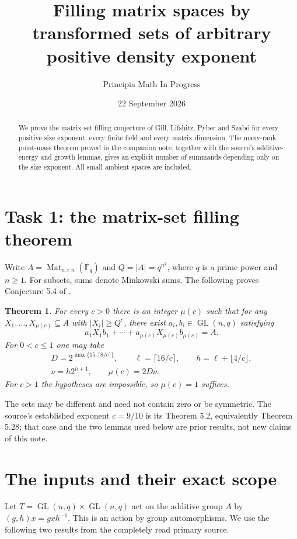 \documentclass[11pt]{article}
\title{Filling matrix spaces by transformed sets of arbitrary positive density exponent}
\author{Principia Math In Progress}
\date{22 September 2026}
\newtheorem{theorem}{Theorem}
\newcommand{\Mat}{\operatorname{Mat}}
\newcommand{\GL}{\operatorname{GL}}
\begin{document}
\maketitle
\begin{abstract}
We prove the matrix-set filling conjecture of Gill, Lifshitz, Pyber and
Szab\'o for every positive size exponent, every finite field and every
matrix dimension. The many-rank point-mass theorem proved in the companion
note, together with the source's additive-energy and growth lemmas,
gives an explicit number of summands depending only on the size exponent.
All small ambient spaces are included.
\end{abstract}

\section*{Task 1: the matrix-set filling theorem}
Write $A=\Mat_{n\times n}(\mathbb F_q)$ and $Q=|A|=q^{n^2}$, where
$q$ is a prime power and $n\ge1$. For subsets, sums denote Minkowski sums.
The following proves Conjecture 5.4 of \cite{source}.

\begin{theorem}\label{main}
For every $c>0$ there is an integer $\mu(c)$ such that for any
$X_1,\ldots,X_{\mu(c)}\subseteq A$ with $|X_i|\ge Q^c$, there exist
$a_i,b_i\in\GL(n,q)$ satisfying
\[
 a_1X_1b_1+\cdots+a_{\mu(c)}X_{\mu(c)}b_{\mu(c)}=A.
\]
For $0<c\le1$ one may take
\[
 \begin{gathered}
 D=2^{\max\{15,\lceil8/c\rceil\}},\qquad
 \ell=\lceil16/c\rceil,\qquad h=\ell+\lfloor4/c\rfloor,\\
 \nu=h2^{h+1},\qquad \mu(c)=2D\nu.
 \end{gathered}
\]
For $c>1$ the hypotheses are impossible, so $\mu(c)=1$ suffices.
\end{theorem}

The sets may be different and need not contain zero or be symmetric.
The source's established exponent $c=9/10$ is its Theorem 5.2,
equivalently Theorem 5.28; that case and the two lemmas used below are
prior results, not new claims of this note.

\section*{The inputs and their exact scope}
Let $T=\GL(n,q)\times\GL(n,q)$ act on the additive group $A$ by
$(g,h)x=gxh^{-1}$. This is an action by group automorphisms.
We use the following two results from the completely read primary source.
\end{document}
